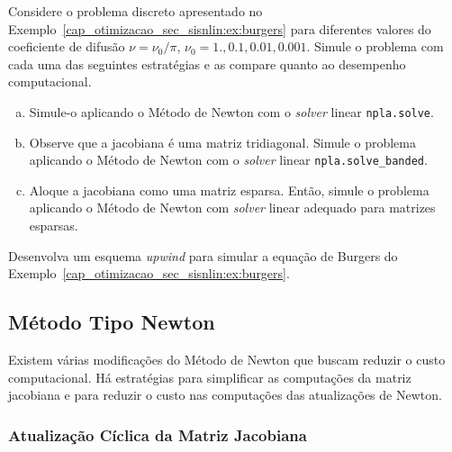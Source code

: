 \begin{exer}\label{cap_otimizacao_sec_sisnlin:exer:burgers}
  Considere o problema discreto apresentado no Exemplo~\ref{cap_otimizacao_sec_sisnlin:ex:burgers} para diferentes valores do coeficiente de difusão $\nu = \nu_0/\pi$, $\nu_0 = 1., 0.1, 0.01, 0.001$. Simule o problema com cada uma das seguintes estratégias e as compare quanto ao desempenho computacional.
  \begin{enumerate}[a)]
  \item Simule-o aplicando o Método de Newton com o {\it solver} linear \lstinline+npla.solve+.
  \item Observe que a jacobiana é uma matriz tridiagonal. Simule o problema aplicando o Método de Newton com o {\it solver} linear \lstinline+npla.solve_banded+.
  \item Aloque a jacobiana como uma matriz esparsa. Então, simule o problema aplicando o Método de Newton com {\it solver} linear adequado para matrizes esparsas.
  \end{enumerate}
\end{exer}

\begin{exer}
  Desenvolva um esquema \textit{upwind} para simular a equação de Burgers do Exemplo~\ref{cap_otimizacao_sec_sisnlin:ex:burgers}.
\end{exer}

\subsection{Método Tipo Newton}\label{cap_otimizacao_sec_sisnlin_ssec_tipoNewton}
\badgeRevisar

Existem várias modificações do Método de Newton{\newton} que buscam reduzir o custo computacional. Há estratégias para simplificar as computações da matriz jacobiana{\jacobi} e para reduzir o custo nas computações das atualizações de Newton.

\subsubsection{Atualização Cíclica da Matriz Jacobiana}

